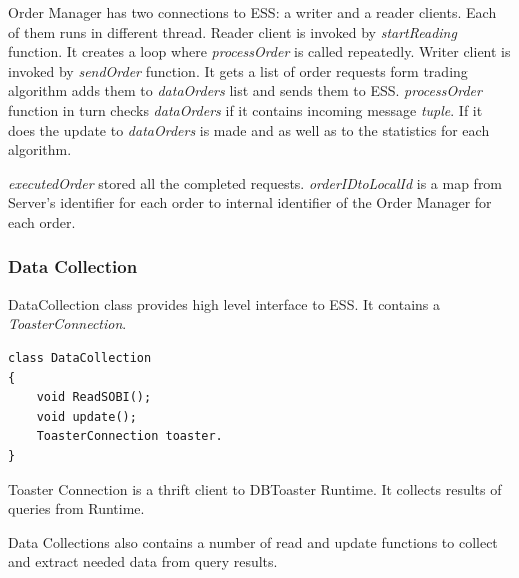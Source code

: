 \documentclass[14pt]{article}
\begin{document}
Order Manager has two connections to ESS: a writer and a reader clients. Each of them runs in different thread. Reader client is invoked by \emph{startReading} function. It creates a loop where \emph{processOrder} is called repeatedly. Writer client is invoked by \emph{sendOrder} function. It gets a list of order requests form trading algorithm adds them to \emph{dataOrders} list and sends them to ESS. \emph{processOrder} function in turn checks \emph{dataOrders} if it contains incoming message \emph{tuple}. If it does the update to \emph{dataOrders} is made and as well as to the statistics for each algorithm.

\emph{executedOrder} stored all the completed requests. \emph{orderIDtoLocalId} is a map from Server's identifier for each order to internal identifier of the Order Manager for each order.


\subsubsection{Data Collection}
DataCollection class provides high level interface to ESS. It contains a \emph{ToasterConnection}. 

\begin{verbatim}
class DataCollection
{
    void ReadSOBI();
    void update();
    ToasterConnection toaster.
}
\end{verbatim}

Toaster Connection is a thrift client to DBToaster Runtime. It collects results of queries from Runtime. 

Data Collections also contains a number of read and update functions to collect and extract needed data from query results.



\end{document}
